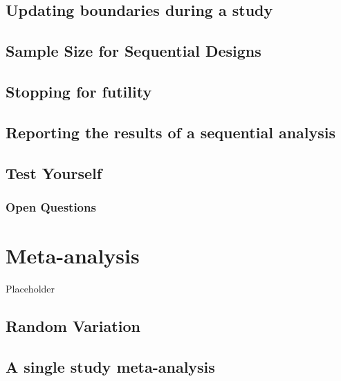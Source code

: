 \documentclass[
  oneside]{krantz}
\begin{document}
\hypertarget{updating-boundaries-during-a-study}{%
\subsection{Updating boundaries during a
study}\label{updating-boundaries-during-a-study}}

\hypertarget{sample-size-for-sequential-designs}{%
\subsection{Sample Size for Sequential
Designs}\label{sample-size-for-sequential-designs}}

\hypertarget{stopping-for-futility}{%
\subsection{Stopping for futility}\label{stopping-for-futility}}

\hypertarget{reporting-the-results-of-a-sequential-analysis}{%
\subsection{Reporting the results of a sequential
analysis}\label{reporting-the-results-of-a-sequential-analysis}}

\hypertarget{test-yourself-8}{%
\subsection{Test Yourself}\label{test-yourself-8}}

\hypertarget{open-questions-8}{%
\subsubsection{Open Questions}\label{open-questions-8}}

\hypertarget{meta}{%
\section{Meta-analysis}\label{meta}}

Placeholder

\hypertarget{random-variation}{%
\subsection{Random Variation}\label{random-variation}}

\hypertarget{a-single-study-meta-analysis}{%
\subsection{A single study
meta-analysis}\label{a-single-study-meta-analysis}}
\end{document}
